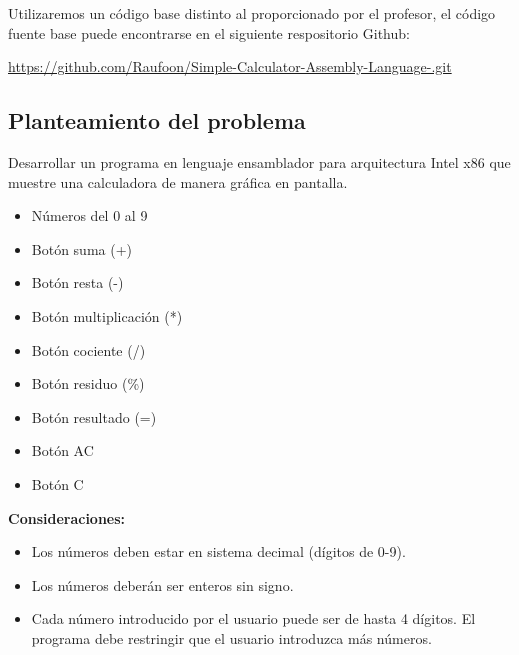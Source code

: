 \documentclass[letterpaper,12 pt,titlepage]{article}
\begin{document}
        Utilizaremos un código base distinto al proporcionado por el profesor, el código fuente base puede encontrarse en el siguiente respositorio Github:
        
        \url{https://github.com/Raufoon/Simple-Calculator-Assembly-Language-.git}

    \subsection{Planteamiento del problema}

        Desarrollar un programa en lenguaje ensamblador para arquitectura Intel x86 que muestre una calculadora de manera gráfica en pantalla.
        
        \begin{center}
            \begin{minipage}{0.95\linewidth}
                \begin{itemize}
                    \item Números del 0 al 9
                    \item Botón suma (+)
                    \item Botón resta (-)
                    \item Botón multiplicación (*)
                    \item Botón cociente (/)
                    \item Botón residuo (\%)
                    \item Botón resultado (=)
                    \item Botón AC
                    \item Botón C
                \end{itemize}
            \end{minipage}
        \end{center}

        \textbf{Consideraciones:}
        
        \begin{center}
            \begin{minipage}{0.95\linewidth}
                \begin{itemize}
                    \item Los números deben estar en sistema decimal (dígitos de 0-9).
                    \item Los números deberán ser enteros sin signo.
                    \item Cada número introducido por el usuario puede ser de hasta 4 dígitos. El programa debe restringir que el usuario introduzca más números.
                \end{itemize}
            \end{minipage}
        \end{center}
\end{document}
